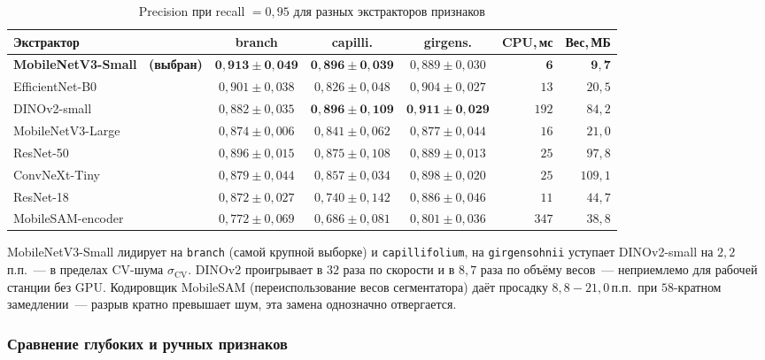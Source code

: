 \begin{table}[H]
\centering
\caption{Precision при recall $= 0{,}95$ для разных экстракторов признаков}
\label{tab:clf_backbones}
\scriptsize
\begin{tabular}{lcccrr}
\hline
\textbf{Экстрактор} & \textbf{branch} & \textbf{capilli.} & \textbf{girgens.} &
\textbf{CPU,\,мс} & \textbf{Вес,\,МБ} \\
\hline
\textbf{MobileNetV3-Small~\cite{Howard2019} (выбран)} & $\mathbf{0{,}913 \pm 0{,}049}$ & $\mathbf{0{,}896 \pm 0{,}039}$ & $0{,}889 \pm 0{,}030$ & $\mathbf{6}$ & $\mathbf{9{,}7}$ \\
EfficientNet-B0~\cite{Tan2019EffNet}    & $0{,}901 \pm 0{,}038$ & $0{,}826 \pm 0{,}048$ & $0{,}904 \pm 0{,}027$ & $13$  & $20{,}5$ \\
DINOv2-small~\cite{Oquab2024DINOv2}       & $0{,}882 \pm 0{,}035$ & $\mathbf{0{,}896 \pm 0{,}109}$ & $\mathbf{0{,}911 \pm 0{,}029}$ & $192$ & $84{,}2$ \\
MobileNetV3-Large~\cite{Howard2019}  & $0{,}874 \pm 0{,}006$ & $0{,}841 \pm 0{,}062$ & $0{,}877 \pm 0{,}044$ & $16$  & $21{,}0$ \\
ResNet-50~\cite{He2016ResNet}          & $0{,}896 \pm 0{,}015$ & $0{,}875 \pm 0{,}108$ & $0{,}889 \pm 0{,}013$ & $25$  & $97{,}8$ \\
ConvNeXt-Tiny~\cite{Liu2022ConvNeXt}      & $0{,}879 \pm 0{,}044$ & $0{,}857 \pm 0{,}034$ & $0{,}898 \pm 0{,}020$ & $25$  & $109{,}1$ \\
ResNet-18~\cite{He2016ResNet}          & $0{,}872 \pm 0{,}027$ & $0{,}740 \pm 0{,}142$ & $0{,}886 \pm 0{,}046$ & $11$  & $44{,}7$ \\
MobileSAM-encoder~\cite{Zhang2023}  & $0{,}772 \pm 0{,}069$ & $0{,}686 \pm 0{,}081$ & $0{,}801 \pm 0{,}036$ & $347$ & $38{,}8$ \\
\hline
\end{tabular}
\end{table}

MobileNetV3-Small лидирует на \texttt{branch} (самой крупной выборке) и
\texttt{capillifolium}, на \texttt{girgensohnii} уступает DINOv2-small на
$2{,}2$\,п.п.~--- в пределах CV-шума $\sigma_{\text{CV}}$. DINOv2
проигрывает в $32$ раза по скорости и в $8{,}7$ раза по объёму весов~---
неприемлемо для рабочей станции без GPU. Кодировщик MobileSAM
(переиспользование весов сегментатора) даёт просадку
$8{,}8\!-\!21{,}0$\,п.п.\ при $58$-кратном замедлении~--- разрыв
кратно превышает шум, эта замена однозначно отвергается.

\subsubsection*{Сравнение глубоких и ручных признаков}

